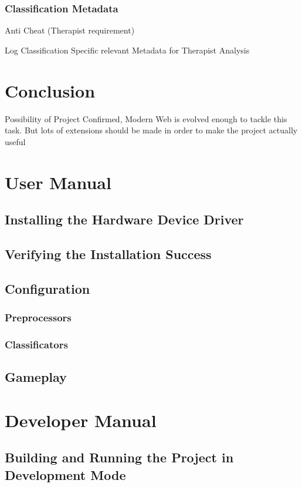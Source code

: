 \documentclass[master,english]{hgbthesis}
\begin{document}
\subsection{Classification Metadata}
Anti Cheat (Therapist requirement)

Log Classification Specific relevant Metadata for Therapist Analysis

\chapter{Conclusion}
Possibility of Project Confirmed, Modern Web is evolved enough to tackle this task. But lots of extensions should be made in order to make the project actually useful




\appendix                                         %
\chapter{User Manual}
\section{Installing the Hardware Device Driver}
\section{Verifying the Installation Success}
\section{Configuration}
\subsection{Preprocessors}
\subsection{Classificators}
\section{Gameplay}
\chapter{Developer Manual}
\section{Building and Running the Project in Development Mode}
\end{document}
